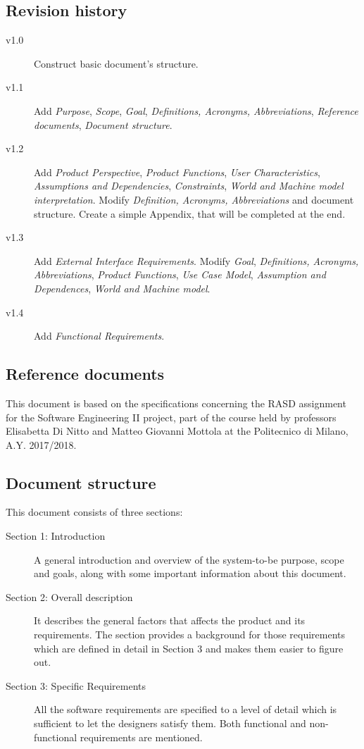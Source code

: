 \documentclass{article}
\begin{document}
	\subsection{Revision history}
	\begin{description}
		\item[v1.0] Construct basic document's structure.
		\item[v1.1] Add \textit{Purpose}, \textit{Scope}, \textit{Goal}, \textit{Definitions, Acronyms, Abbreviations}, \textit{Reference documents}, \textit{Document structure}.
		\item[v1.2] Add \textit{Product Perspective}, \textit{Product Functions}, \textit{User Characteristics}, \textit{Assumptions and Dependencies}, \textit{Constraints}, \textit{World and Machine model interpretation}. Modify \textit{Definition, Acronyms, Abbreviations} and document structure. Create a simple Appendix, that will be completed at the end.
		\item[v1.3] Add \textit{External Interface Requirements}. Modify \textit{Goal}, \textit{Definitions, Acronyms, Abbreviations}, \textit{Product Functions}, \textit{Use Case Model}, \textit{Assumption and Dependences}, \textit{World and Machine model}.
		\item[v1.4] Add \textit{Functional Requirements}.
	\end{description}
	
	
	\subsection{Reference documents}
	This document is based on the specifications concerning the RASD assignment for the Software Engineering II project, part of the course held by professors Elisabetta Di Nitto and Matteo Giovanni Mottola at the Politecnico di Milano, A.Y. 2017/2018.
	
	
	\subsection{Document structure}
	This document consists of three sections:

	\begin{description}
		\item[Section 1: Introduction] A general introduction and overview of the system-to-be purpose, scope and goals, along with some important information about this document.
		\item[Section 2: Overall description] It describes the general factors that affects the product and its requirements. The section provides a background for those requirements which are defined in detail in Section 3 and makes them easier to figure out.
		\item[Section 3: Specific Requirements] All the software requirements are specified to a level of detail which is sufficient to let the designers satisfy them. Both functional and non-functional requirements are mentioned.
	\end{description}
	
\end{document}
